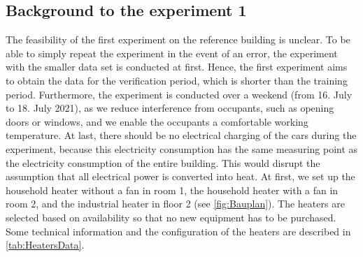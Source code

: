 \subsection{Background to the experiment 1}
\label{subsec:Backgroud to experiment 1}
The feasibility of the first experiment on the reference building is unclear. To be able to simply repeat the experiment in the event of an error, the experiment with the smaller data set is conducted at first. Hence, the first experiment aims to obtain the data for the verification period, which is shorter than the training period. Furthermore, the experiment is conducted over a weekend (from 16. July to 18. July 2021), as we reduce interference from occupants, such as opening doors or windows, and we enable the occupants a comfortable working temperature. At last, there should be no electrical charging of the cars during the experiment, because this electricity consumption has the same measuring point as the electricity consumption of the entire building. This would disrupt the assumption that all electrical power is converted into heat.\newline
At first, we set up the household heater without a fan in room 1, the household heater with a fan in room 2, and the industrial heater in floor 2 (see \autoref{fig:Bauplan}). The heaters are selected based on availability so that no new equipment has to be purchased. Some technical information and the configuration of the heaters are described in \autoref{tab:HeatersData}.

